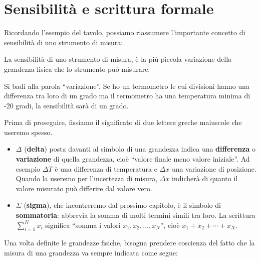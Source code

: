\section{Sensibilità e scrittura formale}

Ricordando l'esempio del tavolo, possiamo riassumere l'importante concetto di sensibilità di uno strumento di misura:

\begin{sen}
	La sensibilità di uno strumento di misura, è la più piccola variazione della grandezza fisica che lo strumento può misurare.
\end{sen}

Si badi alla parola ``variazione''. Se ho un termometro le cui divisioni hanno una differenza tra loro di un grado ma il termometro ha una temperatura minima di -20 gradi, la sensibilità sarà di un grado.

\begin{remark}
Prima di proseguire, fissiamo il significato di due lettere greche maiuscole che useremo spesso.
\begin{itemize}
\item $\Delta$ (\textbf{delta}) posta davanti al simbolo di una grandezza indica una \textbf{differenza} o \textbf{variazione} di quella grandezza, cioè ``valore finale meno valore iniziale''. Ad esempio $\Delta T$ è una differenza di temperatura e $\Delta x$ una variazione di posizione. Quando la useremo per l'incertezza di misura, $\Delta x$ indicherà di quanto il valore misurato può differire dal valore vero.
\item $\Sigma$ (\textbf{sigma}), che incontreremo dal prossimo capitolo, è il simbolo di \textbf{sommatoria}: abbrevia la somma di molti termini simili tra loro. La scrittura $\sum_{i=1}^{N} x_i$ significa ``somma i valori $x_1, x_2, \ldots, x_N$'', cioè $x_1 + x_2 + \cdots + x_N$.
\end{itemize}
\end{remark}

Una volta definite le grandezze fisiche, bisogna prendere coscienza del fatto che la misura di una grandezza va sempre indicata come segue:

